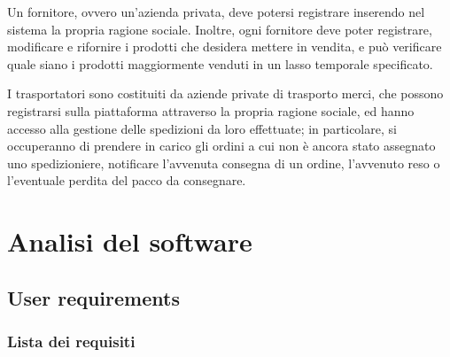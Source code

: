 \documentclass[12pt]{report}
\begin{document}
    Un fornitore, ovvero un'azienda privata, deve potersi registrare inserendo nel sistema la propria ragione sociale. Inoltre, ogni fornitore deve poter registrare, modificare e rifornire i prodotti che desidera mettere in vendita, e può verificare quale siano i prodotti maggiormente venduti in un lasso temporale specificato.

    I trasportatori sono costituiti da aziende private di trasporto merci, che possono registrarsi sulla piattaforma attraverso la propria ragione sociale, ed hanno accesso alla gestione delle spedizioni da loro effettuate; in particolare, si occuperanno di prendere in carico gli ordini a cui non è ancora stato assegnato uno spedizioniere, notificare l'avvenuta consegna di un ordine, l'avvenuto reso o l'eventuale perdita del pacco da consegnare.


    \chapter{Analisi del software}

    \section{User requirements}

    \subsection{Lista dei requisiti}
   
\end{document}
